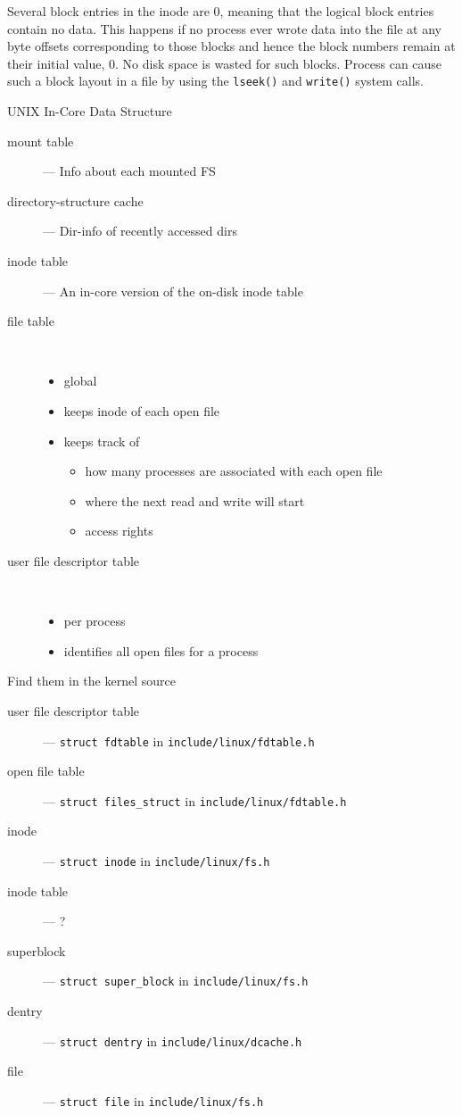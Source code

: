 Several block entries in the inode are 0, meaning that the logical block entries contain
no data. This happens if no process ever wrote data into the file at any byte offsets
corresponding to those blocks and hence the block numbers remain at their initial value,
0. No disk space is wasted for such blocks. Process can cause such a block layout in a
file by using the \verb|lseek()| and \verb|write()| system calls.

\begin{frame}{UNIX In-Core Data Structure}
  \begin{description}
  \item[mount table] --- Info about each mounted FS
  \item[directory-structure cache] --- Dir-info of recently
      accessed dirs
  \item[inode table] --- An in-core version of the on-disk inode table
  \item[file table]\ 
    \begin{itemize}
    \item global
    \item keeps inode of each open file
    \item keeps track of
      \begin{itemize}
      \item how many processes are associated with each open file
      \item where the next read and write will start
      \item access rights
      \end{itemize}
    \end{itemize}
  \item[user file descriptor table]\ 
    \begin{itemize}
    \item per process
    \item identifies all open files for a process
    \end{itemize}
  \end{description}
\end{frame}

Find them in the kernel source
  \begin{description}
  \item[user file descriptor table] --- \texttt{struct fdtable} in
    \texttt{include/linux/fdtable.h}
  \item[open file table] --- \texttt{struct files\_struct} in
    \texttt{include/linux/fdtable.h}
  \item[inode] --- \texttt{struct inode} in \texttt{include/linux/fs.h}
  \item[inode table] --- ?
  \item[superblock] --- \texttt{struct super\_block} in \texttt{include/linux/fs.h}
  \item[dentry] --- \texttt{struct dentry} in \texttt{include/linux/dcache.h}
  \item[file] --- \texttt{struct file} in \texttt{include/linux/fs.h}
  \end{description}

